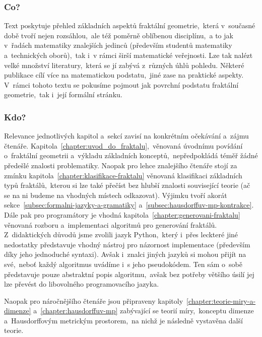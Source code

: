 \label{chapter:predmluva}

\subsubsection{Co?}

Text poskytuje přehled základních aspektů fraktální geometrie,~která v~současné době tvoří nejen rozsáhlou,~ale též poměrně oblíbenou disciplínu,~a to jak v~řadách matematiky znalejších jedinců (především studentů matematiky a~technických oborů),~tak i~v rámci širší matematické veřejnosti. Lze tak nalézt velké množství literatury,~která se jí zabývá z~různých úhlů pohledu. Některé publikace cílí více na matematickou podstatu,~jiné zase na praktické aspekty. V~rámci tohoto textu se pokusíme pojmout jak povrchní podstatu fraktální geometrie,~tak i~její formální stránku.

\subsubsection{Kdo?}

Relevance jednotlivých kapitol a~sekcí zavisí na konkrétním očekávání a~zájmu čtenáře. Kapitola~\ref{chapter:uvod_do_fraktalu},~věnovaná úvodnímu povídání o~fraktální geometrii a~výkladu základních konceptů,~nepředpokládá téměř žádné předešlé znalosti problematiky. Naopak pro lehce znalejšího čtenáře stojí za zmínku kapitola~\ref{chapter:klasifikace-fraktalu} věnovaná klasifikaci základních typů fraktálů,~kterou si lze také přečíst bez hlubší znalosti související teorie (ač se na ni budeme na vhodných místech odkazovat). Výjimku tvoří akorát sekce~\ref{subsec:formalni-jazyky-a-gramatiky} a~\ref{subsec:hausdorffuv-mp-kontrakce}. Dále pak pro programátory je vhodná kapitola~\ref{chapter:generovani-fraktalu} věnovaná rozboru a~implementaci algoritmů pro generování fraktálů. Z~didaktických důvodů jsme zvolili jazyk Python,~který i~přes leckteré jiné nedostatky představuje vhodný nástroj pro názornost implementace (především díky jeho jednoduché syntaxi). Avšak i~znalci jiných jazyků si mohou přijít na své,~neboť každý algoritmus uvádíme i~s jeho pseudokódem. Ten sám o~sobě představuje pouze abstraktní popis algoritmu,~avšak bez potřeby většího úsilí jej lze převést do libovolného programovacího jazyka.

Naopak pro náročnějšího čtenáře jsou připraveny kapitoly~\ref{chapter:teorie-miry-a-dimenze} a~\ref{chapter:hausdorffuv-mp} zabývající se teorií míry,~konceptu dimenze a~Hausdorffovým metrickým prostorem,~na nichž je následně vystavěna další teorie.

